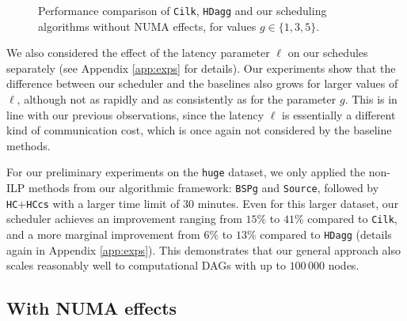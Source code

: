 \documentclass[sigconf,nonacm]{acmart}
\begin{document}
\begin{figure*}[ht]
\begin{minipage}[b]{0.3\textwidth}
  \end{minipage}
  \hspace{0.02\textwidth}
    \begin{minipage}[b]{0.3\textwidth}
  \end{minipage}
  \hfill
  \caption{Performance comparison of \texttt{Cilk}, \texttt{HDagg} and our scheduling algorithms without NUMA effects, for values $g \in \{1,3,5\}$.}
  \label{fig:base_diag}
\end{figure*}

We also considered the effect of the latency parameter $\ell$ on our schedules separately (see Appendix \ref{app:exps} for details). Our experiments show that the difference between our scheduler and the baselines also grows for larger values of $\ell$, although not as rapidly and as consistently as for the parameter $g$. This is in line with our previous observations, since the latency $\ell$ is essentially a different kind of communication cost, which is once again not considered by the baseline methods. 

For our preliminary experiments on the \texttt{huge} dataset, we only applied the non-ILP methods from our algorithmic framework: \texttt{BSPg} and \texttt{Source}, followed by \texttt{HC}+\texttt{HCcs} with a larger time limit of $30$ minutes. Even for this larger dataset, our scheduler achieves an improvement ranging from $15\%$ to $41\%$ compared to \texttt{Cilk}, and a more marginal improvement from $6\%$ to $13\%$ compared to \texttt{HDagg} (details again in Appendix \ref{app:exps}). This demonstrates that our general approach also scales reasonably well to computational DAGs with up to $100_{\,}000$ nodes.

\subsection{With NUMA effects} \label{sec:numaexp}
\end{document}
